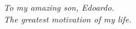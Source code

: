 \begin{center}
	\thispagestyle{empty}
	\vspace*{\fill}
	\begin{flushright}
	\textit{To my amazing son, Edoardo.\\The greatest motivation of my life.}
	\end{flushright}

	\vspace*{\fill}
\end{center}

